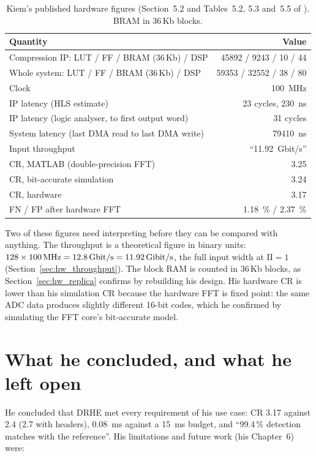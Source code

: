 \begin{table}[htbp]
\centering
\caption[Kiem's hardware results]{Kiem's published hardware figures
(Section~5.2 and Tables~5.2, 5.3 and~5.5 of \cite{kiem2025}). BRAM in 36\,Kb
blocks.}
\label{tab:kc_hwres}
\small
\begin{tabular}{@{}lr@{}}
\toprule
Quantity & Value\\
\midrule
Compression IP: LUT / FF / BRAM (36\,Kb) / DSP & \num{45892} / \num{9243} / 10 / 44\\
Whole system: LUT / FF / BRAM (36\,Kb) / DSP & \num{59353} / \num{32552} / 38 / 80\\
Clock & \SI{100}{\mega\hertz}\\
IP latency (HLS estimate) & 23 cycles, \SI{230}{\nano\second}\\
IP latency (logic analyser, to first output word) & 31 cycles\\
System latency (last DMA read to last DMA write) & \SI{79410}{\nano\second}\\
Input throughput & ``\SI{11.92}{Gbit/s}''\\
CR, MATLAB (double-precision FFT) & 3.25\\
CR, bit-accurate simulation & 3.24\\
CR, hardware & 3.17\\
FN / FP after hardware FFT & \SI{1.18}{\percent} / \SI{2.37}{\percent}\\
\bottomrule
\end{tabular}
\end{table}

\noindent
Two of these figures need interpreting before they can be compared with
anything. The throughput is a theoretical figure in binary units:
$128 \times \SI{100}{\mega\hertz} = \SI{12.8}{Gbit/s} = \SI{11.92}{\gibi
bit/s}$, the full input width at $\mathrm{II} = 1$
(Section~\ref{sec:hw_throughput}). The block RAM is counted in 36\,Kb blocks, as
Section~\ref{sec:hw_replica} confirms by rebuilding his design. His hardware CR
is lower than his simulation CR because the hardware FFT is fixed point: the
same ADC data produces slightly different 16-bit codes, which he confirmed by
simulating the FFT core's bit-accurate model.

\section{What he concluded, and what he left open}
\label{sec:kc_open}

He concluded that DRHE met every requirement of his use case: CR \num{3.17}
against 2.4 (2.7 with headers), \SI{0.08}{\milli\second} against a
\SI{15}{\milli\second} budget, and ``99.4\,\% detection matches with the
reference''. His limitations and future work (his Chapter~6) were:

